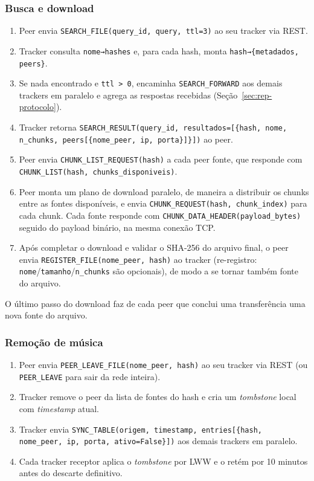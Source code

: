 \documentclass[12pt, a4paper]{article}
\begin{document}
\subsubsection*{Busca e download}
\begin{enumerate}
    \item Peer envia \texttt{SEARCH\_FILE(query\_id, query, ttl=3)} ao seu tracker via REST.
    \item Tracker consulta \texttt{nome→hashes} e, para cada hash, monta \texttt{hash→\{metadados, peers\}}.
    \item Se nada encontrado e \texttt{ttl > 0}, encaminha \texttt{SEARCH\_FORWARD} aos demais trackers em paralelo e agrega as respostas recebidas (Seção~\ref{sec:rep-protocolo}).
    \item Tracker retorna \texttt{SEARCH\_RESULT(query\_id, resultados=[\{hash, nome, n\_chunks, peers[\{nome\_peer, ip, porta\}]\}])} ao peer.
    \item Peer envia \texttt{CHUNK\_LIST\_REQUEST(hash)} a cada peer fonte, que responde com \texttt{CHUNK\_LIST(hash, chunks\_disponiveis)}.
    \item Peer monta um plano de download paralelo, de maneira a distribuir os chunks entre as fontes disponíveis, e envia \texttt{CHUNK\_REQUEST(hash, chunk\_index)} para cada chunk. Cada fonte responde com \texttt{CHUNK\_DATA\_HEADER(payload\_bytes)} seguido do payload binário, na mesma conexão TCP.
    \item Após completar o download e validar o SHA-256 do arquivo final, o peer envia \texttt{REGISTER\_FILE(nome\_peer, hash)} ao tracker (re-registro: \texttt{nome}/\texttt{tamanho}/\texttt{n\_chunks} são opcionais), de modo a se tornar também fonte do arquivo.
\end{enumerate}

O último passo do download faz de cada peer que conclui uma transferência uma nova fonte do arquivo.

\subsubsection*{Remoção de música}
\begin{enumerate}
    \item Peer envia \texttt{PEER\_LEAVE\_FILE(nome\_peer, hash)} ao seu tracker via REST (ou \texttt{PEER\_LEAVE} para sair da rede inteira).
    \item Tracker remove o peer da lista de fontes do hash e cria um \textit{tombstone} local com \textit{timestamp} atual.
    \item Tracker envia \texttt{SYNC\_TABLE(origem, timestamp, entries[\{hash, nome\_peer, ip, porta, ativo=False\}])} aos demais trackers em paralelo.
    \item Cada tracker receptor aplica o \textit{tombstone} por LWW e o retém por 10 minutos antes do descarte definitivo.
\end{enumerate}
\end{document}
